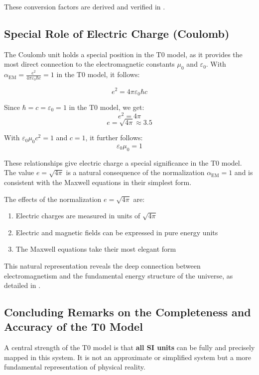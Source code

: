 \documentclass[12pt,a4paper]{article}
\newcommand{\alphaEM}{\alpha_{\text{EM}}}
\begin{document}
	These conversion factors are derived and verified in \cite{pascher_conversions_2025}.
	
	\subsection*{Special Role of Electric Charge (Coulomb)}
	
	The Coulomb unit holds a special position in the T0 model, as it provides the most direct connection to the electromagnetic constants $\mu_0$ and $\varepsilon_0$. With $\alphaEM = \frac{e^2}{4\pi\varepsilon_0\hbar c} = 1$ in the T0 model, it follows:
	
	\[
	e^2 = 4\pi\varepsilon_0\hbar c
	\]
	
	Since $\hbar = c = \varepsilon_0 = 1$ in the T0 model, we get:
	\[
	e^2 = 4\pi
	\]
	\[
	e = \sqrt{4\pi} \approx 3.5
	\]
	
	With $\varepsilon_0\mu_0c^2 = 1$ and $c = 1$, it further follows:
	\[
	\varepsilon_0\mu_0 = 1
	\]
	
	These relationships give electric charge a special significance in the T0 model. The value $e = \sqrt{4\pi}$ is a natural consequence of the normalization $\alphaEM = 1$ and is consistent with the Maxwell equations in their simplest form.
	
	The effects of the normalization $e = \sqrt{4\pi}$ are:
	\begin{enumerate}
		\item Electric charges are measured in units of $\sqrt{4\pi}$
		\item Electric and magnetic fields can be expressed in pure energy units
		\item The Maxwell equations take their most elegant form
	\end{enumerate}
	
	This natural representation reveals the deep connection between electromagnetism and the fundamental energy structure of the universe, as detailed in \cite{pascher_alpha_2025}.
	
	\subsection*{Concluding Remarks on the Completeness and Accuracy of the T0 Model}
	
	A central strength of the T0 model is that \textbf{all SI units} can be fully and precisely mapped in this system. It is not an approximate or simplified system but a more fundamental representation of physical reality.
	
\end{document}
